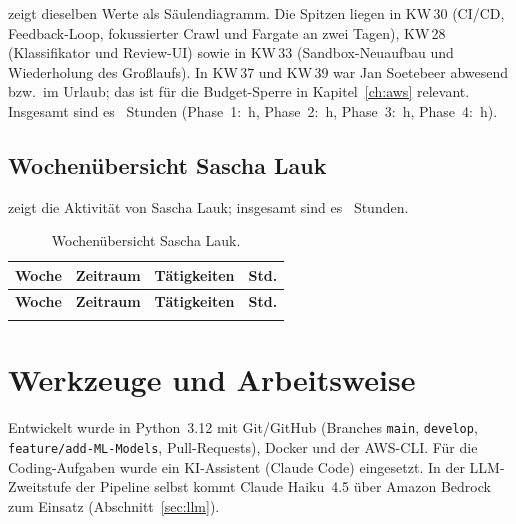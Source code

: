  zeigt dieselben Werte als Säulendiagramm. Die Spitzen liegen in KW\,30 (CI/CD, Feedback-Loop, fokussierter Crawl und Fargate an zwei Tagen), KW\,28 (Klassifikator und Review-UI) sowie in KW\,33 (Sandbox-Neuaufbau und Wiederholung des Großlaufs). In KW\,37 und KW\,39 war Jan Soetebeer abwesend bzw.\ im Urlaub; das ist für die Budget-Sperre in Kapitel~\ref{ch:aws} relevant. Insgesamt sind es \zStundenJan{}~Stunden (Phase~1: \zStundenPhaseEins{}\,h, Phase~2: \zStundenPhaseZwei{}\,h, Phase~3: \zStundenPhaseDrei{}\,h, Phase~4: \zStundenPhaseVier{}\,h).


\subsection*{Wochenübersicht Sascha Lauk}
 zeigt die Aktivität von Sascha Lauk; insgesamt sind es \zStundenSascha{}~Stunden.

{\small
\begin{longtable}{@{}l l p{8.9cm} r@{}}
\caption{Wochenübersicht Sascha Lauk.}\label{tab:wochen-sascha}\\
\toprule
\textbf{Woche} & \textbf{Zeitraum} & \textbf{Tätigkeiten} & \textbf{Std.} \\
\midrule
\endfirsthead
\toprule
\textbf{Woche} & \textbf{Zeitraum} & \textbf{Tätigkeiten} & \textbf{Std.} \\
\midrule
\endhead
\bottomrule
\endlastfoot

\end{longtable}}

\section{Werkzeuge und Arbeitsweise}
Entwickelt wurde in Python~3.12 mit Git/GitHub (Branches \texttt{main}, \texttt{develop}, \texttt{feature/add-ML-Models}, Pull-Requests), Docker und der AWS-CLI. Für die Coding-Aufgaben wurde ein KI-Assistent (Claude Code) eingesetzt. In der LLM-Zweitstufe der Pipeline selbst kommt Claude Haiku~4.5 über Amazon Bedrock zum Einsatz (Abschnitt~\ref{sec:llm}).
